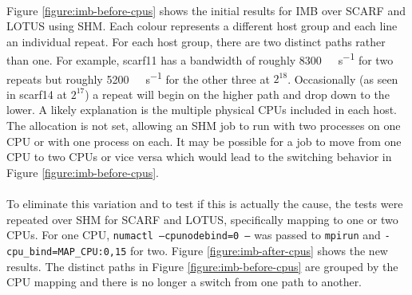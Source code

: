 \documentclass{article}
\begin{document}
            \paragraph{}
            Figure \ref{figure:imb-before-cpus} shows the initial results for IMB over SCARF and LOTUS using SHM. Each colour represents a different host group and each line an individual repeat. For each host group, there are two distinct paths rather than one. For example, scarf11 has a bandwidth of roughly \SI{8300}{\mega\byte\per\second} for two repeats but roughly \SI{5200}{\mega\byte\per\second} for the other three at $2^{18}$\si{\byte}. Occasionally (as seen in scarf14 at $2^{17}$\si{\byte}) a repeat will begin on the higher path and drop down to the lower. A likely explanation is the multiple physical CPUs included in each host. The allocation is not set, allowing an SHM job to run with two processes on one CPU or with one process on each. It may be possible for a job to move from one CPU to two CPUs or vice versa which would lead to the switching behavior in Figure \ref{figure:imb-before-cpus}.

            \paragraph{}
            To eliminate this variation and to test if this is actually the cause, the tests were repeated over SHM for SCARF and LOTUS, specifically mapping to one or two CPUs. For one CPU, \texttt{numactl --cpunodebind=0 --} was passed to \texttt{mpirun} and \texttt{-cpu_bind=MAP_CPU:0,15} for two. Figure \ref{figure:imb-after-cpus} shows the new results. The distinct paths in Figure \ref{figure:imb-before-cpus} are grouped by the CPU mapping and there is no longer a switch from one path to another.
\end{document}

